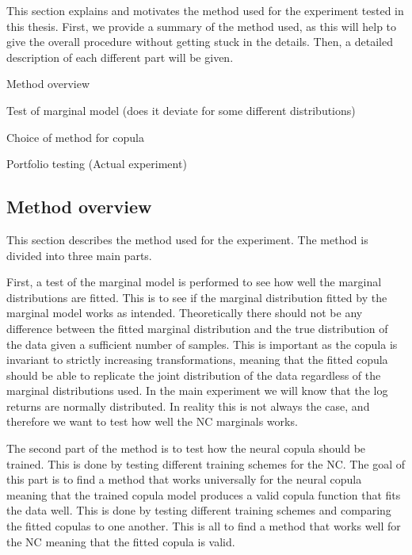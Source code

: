 This section explains and motivates the method used for the experiment tested in this thesis. First, we provide a summary of the method used, as this will help to give the overall procedure without getting stuck in the details. Then, a detailed description of each different part will be given. 


\begin{generalinstructions}
    \begin{compactenum}
        \item Method overview
        \item Test of marginal model (does it deviate for some different distributions)
        \item Choice of method for copula
        \item Portfolio testing (Actual experiment)
    \end{compactenum}
\end{generalinstructions}


\subsection{Method overview}
This section describes the method used for the experiment. The method is divided into three main parts. 

First, a test of the marginal model is performed to see how well the marginal distributions are fitted. This is to see if the marginal distribution fitted by the marginal model works as intended. Theoretically there should not be any difference between the fitted marginal distribution and the true distribution of the data  given a sufficient number of samples. This is important as the copula is invariant to strictly increasing transformations, meaning that the fitted copula should be able to replicate the joint distribution of the data regardless of the marginal distributions used. In the main experiment we will know that the log returns are normally distributed. In reality this is not always the case, and therefore we want to test how well the \gls{NC} marginals works.

The second part of the method is to test how the neural copula should be trained. This is done by testing different training schemes for the \gls{NC}. The goal of this part is to find a method that works universally for the neural copula meaning that the trained copula model produces a valid copula function that fits the data well. This is done by testing different training schemes and comparing the fitted copulas to one another. This is all to find a method that works well for the \gls{NC} meaning that the fitted copula is valid. 

